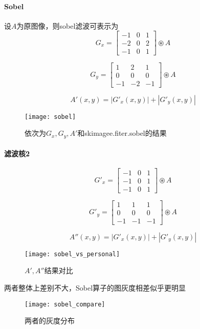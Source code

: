 \documentclass{myreport}
\begin{document}
      \paragraph{Sobel}设$A$为原图像，则sobel滤波可表示为
      $$
        G_x = \begin{bmatrix}
            -1 & 0 & 1 \\
            -2 & 0 & 2 \\
            -1 & 0 & 1
        \end{bmatrix}
        \circledast A 
      $$
      
      $$
        G_y = \begin{bmatrix}
            1 & 2 & 1 \\
            0 & 0 & 0 \\
            -1 & -2 & -1
        \end{bmatrix}
        \circledast A 
      $$
      
      $$
        A'(x,y) = |G'_x(x,y)| + |G'_y(x,y)| 
      $$

      \begin{figure}[H]
        \centering
        \texttt{[image: sobel]}
        \caption{依次为$G_x, G_y, A'$和skimagee.fiter.sobel的结果}
        \label{fig:sobel}
      \end{figure}

      \paragraph{滤波核2}
      $$
        G'_x = \begin{bmatrix}
            -1 & 0 & 1 \\
            -1 & 0 & 1 \\
            -1 & 0 & 1
        \end{bmatrix}
        \circledast A 
      $$
      
      $$
        G'_y = \begin{bmatrix}
            1 & 1 & 1 \\
            0 & 0 & 0 \\
            -1 & -1 & -1
        \end{bmatrix}
        \circledast A 
      $$
      
      $$
        A''(x,y) = |G'_x(x,y)| + |G'_y(x,y)| 
      $$

      \begin{figure}[H]
        \centering
        \texttt{[image: sobel\_vs\_personal]}
        \caption{$A',A''$结果对比}
        \label{fig:sobel_compare}
      \end{figure}
      两者整体上差别不大，Sobel算子的图灰度相差似乎更明显
      \begin{figure}[H]
        \centering
        \texttt{[image: sobel\_compare]}
        \caption{两者的灰度分布}
        \label{fig:sobel_compare}
      \end{figure}
\end{document}

